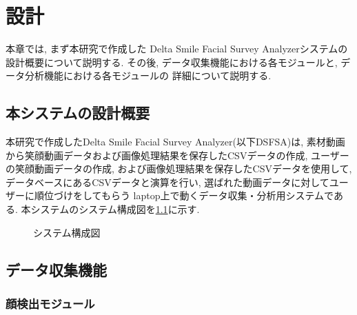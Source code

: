 \chapter{設計}
\label{chap:function}

本章では, まず本研究で作成した Delta Smile Facial Survey Analyzerシステムの
設計概要について説明する.
その後, データ収集機能における各モジュールと, データ分析機能における各モジュールの
詳細について説明する.

\section{本システムの設計概要}
本研究で作成したDelta Smile Facial Survey Analyzer(以下DSFSA)は,
素材動画から笑顔動画データおよび画像処理結果を保存したCSVデータの作成,
ユーザーの笑顔動画データの作成, および画像処理結果を保存したCSVデータを使用して,
データベースにあるCSVデータと演算を行い, 選ばれた動画データに対してユーザーに順位づけをしてもらう
laptop上で動くデータ収集・分析用システムである.
本システムのシステム構成図を\ref{fig:system_architecture}に示す.

\begin{figure}[htbp]
    \begin{center}
    \end{center}
    \caption{システム構成図}
    \label{fig:system_architecture}
\end{figure}

\section{データ収集機能}
\subsection{顔検出モジュール}
